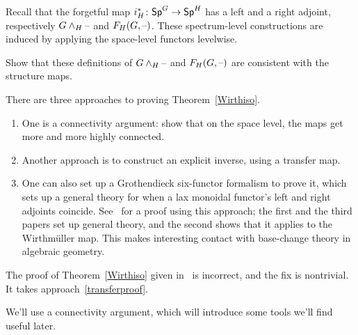 Recall that the forgetful map $i_H^*\colon \mathsf{Sp}^G\to\mathsf{Sp}^H$ has a left and a right adjoint, respectively
$G\wedge_H\text{--}$ and $F_H(G,\text{--})$. These spectrum-level constructions are induced by applying the space-level
functors levelwise.
\begin{ex}
Show that these definitions of $G\wedge_H\text{--}$ and $F_H(G,\text{--})$ are consistent with the structure maps.
\end{ex}
There are three approaches to proving Theorem~\ref{Wirthiso}.
\begin{enumerate}
	\item One is a connectivity argument: show that on the space level, the maps get more and more highly
	connected.
	\item\label{transferproof} Another approach is to construct an explicit inverse, using a transfer map.
	\item One can also set up a Grothendieck six-functor formalism to prove it, which sets up a general theory for
	when a lax monoidal functor's left and right adjoints coincide. See~\cite{FHM, WirthRevisited, BDS} for a proof
	using this approach; the first and the third papers set up general theory, and the second shows that it applies
	to the Wirthmüller map. This makes interesting contact with base-change theory in algebraic geometry.
\end{enumerate}
\begin{warn}
The proof of Theorem~\ref{Wirthiso} given in~\cite{LMS} is incorrect, and the fix is nontrivial. It takes
approach~\eqref{transferproof}.
\end{warn}
We'll use a connectivity argument, which will introduce some tools we'll find useful later.
